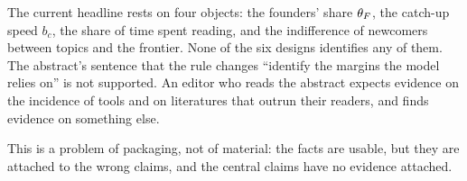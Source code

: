 \begin{critbox}
The current headline rests on four objects: the founders' share $\theta_F$, the catch-up speed $b_c$, the share of time spent reading, and the indifference of newcomers between topics and the frontier. None of the six designs identifies any of them. The abstract's sentence that the rule changes ``identify the margins the model relies on'' is not supported. An editor who reads the abstract expects evidence on the incidence of tools and on literatures that outrun their readers, and finds evidence on something else.

This is a problem of packaging, not of material: the facts are usable, but they are attached to the wrong claims, and the central claims have no evidence attached.
\end{critbox}
